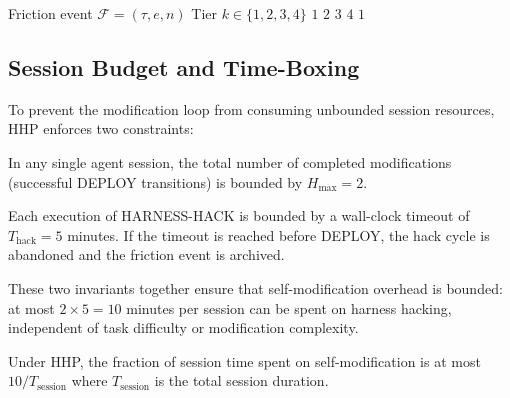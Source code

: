 \begin{algorithm}[H]
\caption{ClassifyScope: Map Friction to Modification Tier}
\label{alg:classify}
\begin{algorithmic}[1]
\Require Friction event $\mathcal{F} = (\tau, e, n)$
\Ensure Tier $k \in \{1, 2, 3, 4\}$
    \State \Return $1$ 
    \State \Return $2$ 
    \State \Return $3$ 
    \State \Return $4$ 
\Else
    \State \Return $1$ 
\EndIf
\end{algorithmic}
\end{algorithm}

\subsection{Session Budget and Time-Boxing}
\label{sec:budget}

To prevent the modification loop from consuming unbounded session resources,
HHP enforces two constraints:

\begin{invariant}
In any single agent session, the total number of completed modifications
(successful DEPLOY transitions) is bounded by $H_{\max} = 2$.
\end{invariant}

\begin{invariant}
Each execution of HARNESS-HACK is bounded by a wall-clock timeout of
$T_{\text{hack}} = 5$ minutes. If the timeout is reached before DEPLOY,
the hack cycle is abandoned and the friction event is archived.
\end{invariant}

These two invariants together ensure that self-modification overhead is bounded:
at most $2 \times 5 = 10$ minutes per session can be spent on harness hacking,
independent of task difficulty or modification complexity.

\begin{theorem}
\label{thm:overhead}
Under HHP, the fraction of session time spent on self-modification is at most
$10 / T_{\text{session}}$ where $T_{\text{session}}$ is the total session
duration.
\end{theorem}

